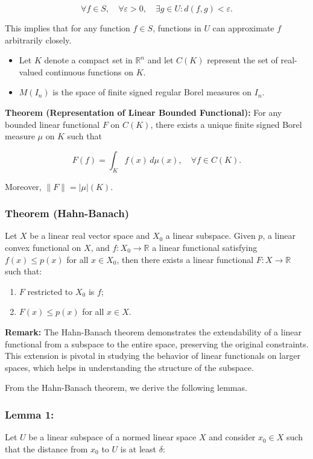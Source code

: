 \[
\forall f \in S, \quad \forall \varepsilon > 0, \quad \exists g \in U : d(f, g) < \varepsilon.
\]

This implies that for any function \(f \in S\), functions in \(U\) can approximate \(f\) arbitrarily closely.

\begin{itemize}
  \item Let \(K\) denote a compact set in \(\mathbb{R}^n\) and let \(C(K)\) represent the set of real-valued continuous functions on \(K\).
  \item \(M(I_n)\) is the space of finite signed regular Borel measures on \(I_n\).\\
\end{itemize}

\textbf{Theorem (Representation of Linear Bounded Functional):} For any bounded linear functional \(F\) on \(C(K)\), there exists a unique finite signed Borel measure \(\mu\) on \(K\) such that

\[
F(f) = \int_K f(x) \, d\mu(x), \quad \forall f \in C(K).
\]

Moreover, \(\|F\| = |\mu|(K)\).\\

\subsubsection{Theorem (Hahn-Banach)}
Let \(X\) be a linear real vector space and \(X_0\) a linear subspace. Given \(p\), a linear convex functional on \(X\), and \(f: X_0 \rightarrow \mathbb{R}\) a linear functional satisfying \(f(x) \leq p(x)\) for all \(x \in X_0\), then there exists a linear functional \(F: X \rightarrow \mathbb{R}\) such that:

\begin{enumerate}
  \item \(F\) restricted to \(X_0\) is \(f\);
  \item \(F(x) \leq p(x)\) for all \(x \in X\).
\end{enumerate}

\textbf{Remark:} The Hahn-Banach theorem demonstrates the extendability of a linear functional from a subspace to the entire space, preserving the original constraints. This extension is pivotal in studying the behavior of linear functionals on larger spaces, which helps in understanding the structure of the subspace.

From the Hahn-Banach theorem, we derive the following lemmas.

\subsubsection{Lemma 1:} Let \(U\) be a linear subspace of a normed linear space \(X\) and consider \(x_0 \in X\) such that the distance from \(x_0\) to \(U\) is at least \(\delta\):

